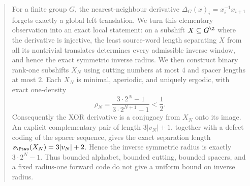 \begin{abstract}
For a finite group $G$, the nearest-neighbour derivative
$\Delta_G(x)_i=x_i^{-1}x_{i+1}$ forgets exactly a global left translation.
We turn this elementary observation into an exact local statement: on a
subshift $X\subseteq G^{\Z}$ where the derivative is injective, the least
source-word length separating $X$ from all its nontrivial translates
determines every admissible inverse window, and hence the exact symmetric
inverse radius.  We then construct binary rank-one subshifts $X_N$ using
cutting numbers at most $4$ and spacer lengths at most $2$.  Each $X_N$ is
minimal, aperiodic, and uniquely ergodic, with exact one-density
\[
 \rho_N=\frac{3\cdot 2^N-1}{3\cdot 2^{N+1}-1}<\frac12.
\]
Consequently the XOR derivative is a conjugacy from $X_N$ onto its image.
An explicit complementary pair of length $3|v_N|+1$, together with a defect
coding of the spacer sequence, gives the exact separation length
$s_{\Ftwo}(X_N)=3|v_N|+2$.  Hence the inverse symmetric radius is exactly
$3\cdot2^N-1$.  Thus bounded alphabet, bounded cutting, bounded spacers, and
a fixed radius-one forward code do not give a uniform bound on inverse
radius.
\end{abstract}
